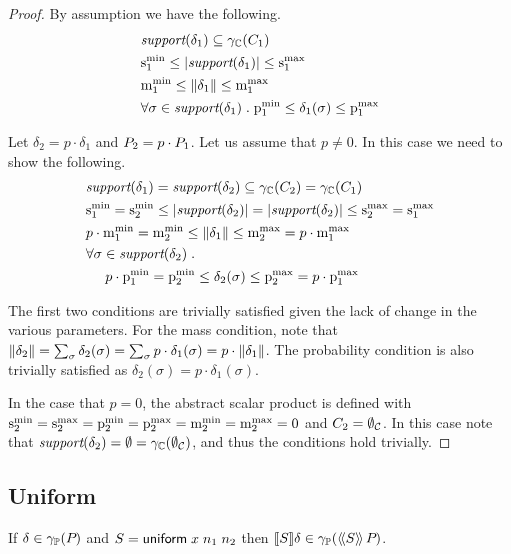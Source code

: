 \begin{proof} By assumption we have the following.
\begin{align*}
& \textit{support}(\delta_1) \subseteq \gamma_{\mathbb{C}}(C_1) \\
& \mathrm{s}^\mathrm{min}_{1} \leq \left| \textit{support}(\delta_1) \right| \leq \mathrm{s}^\mathrm{max}_{1} \\
& \mathrm{m}^\mathrm{min}_{1} \leq \mathord{\parallel}\delta_1\mathord{\parallel} \leq \mathrm{m}^\mathrm{max}_{1} \\
& \forall \sigma \in \textit{support}(\delta_1) \;
. \; \mathrm{p}^\mathrm{min}_{1} \leq \delta_1(\sigma) \leq \mathrm{p}^\mathrm{max}_{1}
\end{align*}

Let $ \delta_2 = p \cdot \delta_1 $ and $ P_{2} = p \cdot P_{1} $. Let us assume that $ p \neq 0 $. In this case we need to show the following.
\begin{align*}
& \textit{support}(\delta_1) = \textit{support}(\delta_2) \subseteq \gamma_{\mathbb{C}}(C_2) = \gamma_{\mathbb{C}}(C_1) \\
& \mathrm{s}^\mathrm{min}_{1}
= \mathrm{s}^\mathrm{min}_{2} \leq \left| \textit{support}(\delta_2) \right|
= \left| \textit{support}(\delta_2) \right| \leq \mathrm{s}^\mathrm{max}_{2} = \mathrm{s}^\mathrm{max}_{1} \\
& p \cdot \mathrm{m}^\mathrm{min}_{1}
= \mathrm{m}^\mathrm{min}_{2} \leq \mathord{\parallel}\delta_1\mathord{\parallel} \leq \mathrm{m}^\mathrm{max}_{2} = p \cdot \mathrm{m}^\mathrm{max}_{1} \\
& \forall \sigma \in \textit{support}(\delta_2) \;
. \; \\
& \;\;\;\;\; p \cdot \mathrm{p}^\mathrm{min}_{1} = \mathrm{p}^\mathrm{min}_{2} \leq \delta_2(\sigma) \leq \mathrm{p}^\mathrm{max}_{2} =
p \cdot \mathrm{p}^\mathrm{max}_{1}
\end{align*}

The first two conditions are trivially satisfied given the lack of
change in the various parameters. For the mass condition, note that
$ \mathord{\parallel}\delta_2\mathord{\parallel} = \sum_{\sigma} \delta_2 (\sigma) = \sum_{\sigma}
p \cdot \delta_1(\sigma) = p \cdot \mathord{\parallel}\delta_1\mathord{\parallel} $. The probability
condition is also trivially satisfied as $ \delta_2(\sigma) =
p \cdot \delta_1(\sigma) $.

In the case that $ p = 0 $, the abstract scalar product is defined
with $ \mathrm{s}^\mathrm{min}_{2} = \mathrm{s}^\mathrm{max}_{2} =
\mathrm{p}^\mathrm{min}_{2} = \mathrm{p}^\mathrm{max}_{2} = \mathrm{m}^\mathrm{min}_{2} = \mathrm{m}^\mathrm{max}_{2} = 0 $ and $ C_2 =
\emptyset_{\mathcal{C}} $. In this case note that $ \textit{support}(\delta_2) = \emptyset
= \gamma_{\mathbb{C}}(\emptyset_{\mathcal{C}}) $, and thus the conditions hold trivially.
\end{proof}

\subsection{Uniform}
\begin{lemma} \label{lem:pp:uniform} If $ \delta \in \gamma_{\mathbb{P}}(P_{}) $
and $ S = \mathsf{uniform}\;{x}\;{n_1}\;n_2 $ then
$ [\![{S}]\!]{\delta} \in \gamma_{\mathbb{P}}(\langle\!\langle{S}\rangle\!\rangle\,{P_{}}) $.
\end{lemma}

